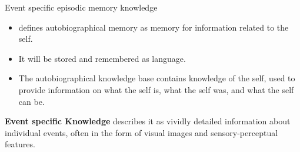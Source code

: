 \begin{frame}[allowframebreaks]{Event specific episodic memory knowledge}
    \begin{itemize}
        \item \cite{brewer-1986-what-is-autobiographical-memory} defines autobiographical memory as memory for information related to the self.
        \item It will be stored and remembered as language.
        \item The autobiographical knowledge base contains knowledge of the self, used to provide information on what the self is, what the self was, and what the self can be.
    \end{itemize}
    
    
    \textbf{Event specific Knowledge}
        \cite{pillemer-2001-momentous-events-and-the-life-story} describes it as vividly detailed information about individual events, often in the form of visual images and sensory-perceptual features.

\end{frame}